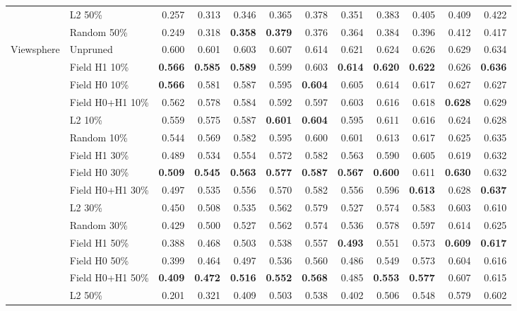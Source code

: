 \begin{tabular}{llrrrrrrrrrr}
 & L2 50\% & 0.257 & 0.313 & 0.346 & 0.365 & 0.378 & 0.351 & 0.383 & 0.405 & 0.409 & 0.422 \\
 & Random 50\% & 0.249 & 0.318 & \textbf{0.358} & \textbf{0.379} & 0.376 & 0.364 & 0.384 & 0.396 & 0.412 & 0.417 \\
\midrule
Viewsphere & Unpruned & 0.600 & 0.601 & 0.603 & 0.607 & 0.614 & 0.621 & 0.624 & 0.626 & 0.629 & 0.634 \\
 & Field H1 10\% & \textbf{0.566} & \textbf{0.585} & \textbf{0.589} & 0.599 & 0.603 & \textbf{0.614} & \textbf{0.620} & \textbf{0.622} & 0.626 & \textbf{0.636} \\
 & Field H0 10\% & \textbf{0.566} & 0.581 & 0.587 & 0.595 & \textbf{0.604} & 0.605 & 0.614 & 0.617 & 0.627 & 0.627 \\
 & Field H0+H1 10\% & 0.562 & 0.578 & 0.584 & 0.592 & 0.597 & 0.603 & 0.616 & 0.618 & \textbf{0.628} & 0.629 \\
 & L2 10\% & 0.559 & 0.575 & 0.587 & \textbf{0.601} & \textbf{0.604} & 0.595 & 0.611 & 0.616 & 0.624 & 0.628 \\
 & Random 10\% & 0.544 & 0.569 & 0.582 & 0.595 & 0.600 & 0.601 & 0.613 & 0.617 & 0.625 & 0.635 \\
\addlinespace[2pt]
 & Field H1 30\% & 0.489 & 0.534 & 0.554 & 0.572 & 0.582 & 0.563 & 0.590 & 0.605 & 0.619 & 0.632 \\
 & Field H0 30\% & \textbf{0.509} & \textbf{0.545} & \textbf{0.563} & \textbf{0.577} & \textbf{0.587} & \textbf{0.567} & \textbf{0.600} & 0.611 & \textbf{0.630} & 0.632 \\
 & Field H0+H1 30\% & 0.497 & 0.535 & 0.556 & 0.570 & 0.582 & 0.556 & 0.596 & \textbf{0.613} & 0.628 & \textbf{0.637} \\
 & L2 30\% & 0.450 & 0.508 & 0.535 & 0.562 & 0.579 & 0.527 & 0.574 & 0.583 & 0.603 & 0.610 \\
 & Random 30\% & 0.429 & 0.500 & 0.527 & 0.562 & 0.574 & 0.536 & 0.578 & 0.597 & 0.614 & 0.625 \\
\addlinespace[2pt]
 & Field H1 50\% & 0.388 & 0.468 & 0.503 & 0.538 & 0.557 & \textbf{0.493} & 0.551 & 0.573 & \textbf{0.609} & \textbf{0.617} \\
 & Field H0 50\% & 0.399 & 0.464 & 0.497 & 0.536 & 0.560 & 0.486 & 0.549 & 0.573 & 0.604 & 0.616 \\
 & Field H0+H1 50\% & \textbf{0.409} & \textbf{0.472} & \textbf{0.516} & \textbf{0.552} & \textbf{0.568} & 0.485 & \textbf{0.553} & \textbf{0.577} & 0.607 & 0.615 \\
 & L2 50\% & 0.201 & 0.321 & 0.409 & 0.503 & 0.538 & 0.402 & 0.506 & 0.548 & 0.579 & 0.602 \\

\end{tabular}
